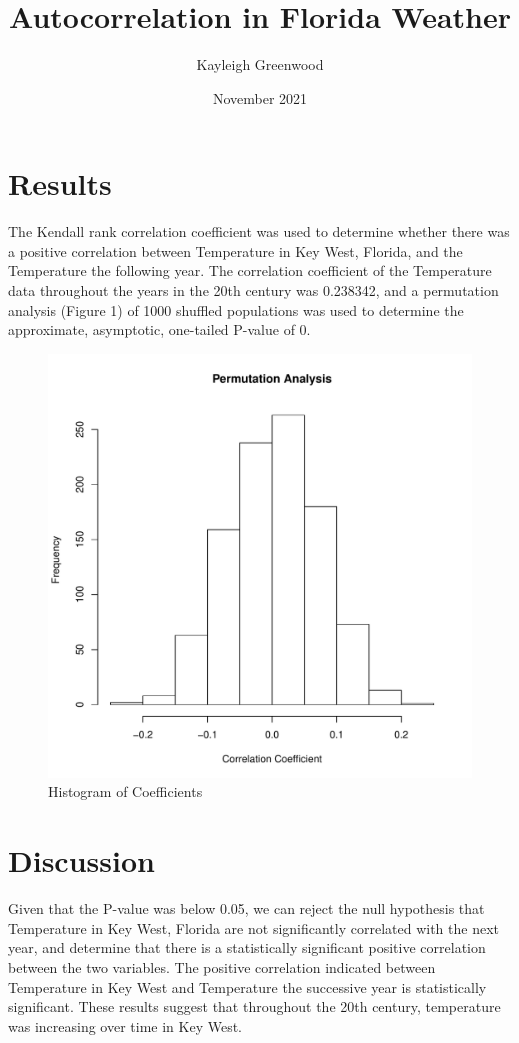 \documentclass{article}
\title{Autocorrelation in Florida Weather}
\author{Kayleigh Greenwood}
\date{November 2021}
\begin{document}
\maketitle

\section{Results}
The Kendall rank correlation coefficient was used to determine whether there was a positive correlation between Temperature in Key West, Florida, and the Temperature the following year. The correlation coefficient of the Temperature data throughout the years in the 20th century was 0.238342, and a permutation analysis (Figure 1) of 1000 shuffled populations was used to determine the approximate, asymptotic, one-tailed P-value of 0.

\begin{figure}[H]
\centering
\includegraphics[scale=0.75]{../results/TAutoCorrhist.pdf}
\caption{Histogram of Coefficients}
\end{figure}

\section{Discussion}
 Given that the P-value was below 0.05, we can reject the null hypothesis that Temperature in Key West, Florida are not significantly correlated with the next year, and determine that there is a statistically significant positive correlation between the two variables. The positive correlation indicated between Temperature in Key West and Temperature the successive year is statistically significant.
These results suggest that throughout the 20th century, temperature was increasing over time in Key West.
\end{document}
